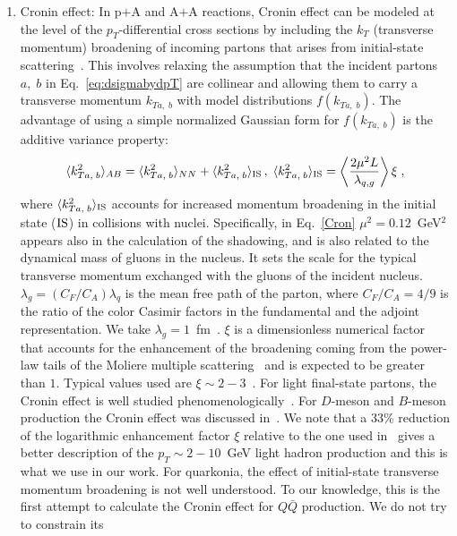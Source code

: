 \documentclass[article,showpacs,preprintnumbers,amsmath,amssymb]{revtex4}
\newcommand{\barQ}{{\bar{Q}}}
\newcommand{\rIS}{{\rm IS}}
\begin{document}
\begin{enumerate}
\item{Cronin effect: In p$+$A and A$+$A reactions, Cronin effect can be modeled at the
level of the $p_T$-differential cross sections by including the $k_T$
(transverse momentum) broadening of incoming partons that arises from
initial-state scattering~\cite{Accardi:2002ik,Vitev:2003xu}. This involves
relaxing the assumption that the incident partons $a,\;b$ in
Eq.~\ref{eq:dsigmabydpT} are collinear and allowing them to carry a
transverse momentum $k_{Ta,\;b}$ with model distributions $f(k_{Ta,\;b})$. The
advantage of using a simple normalized Gaussian form for $f({k}_{Ta,\;b})$ is
the additive variance property:   
\begin{equation}
\langle {k}_{Ta,\;b}^2 \rangle_{AB} = \langle { k}_{Ta,\;b}^2 \rangle_{NN}
+  \langle {k}_{Ta,\;b}^2 \rangle_{\rIS}\, , \;  
\langle {k}_{Ta,\;b}^2 \rangle_{\rIS} = \left\langle \frac{2 \mu^2 L}{\lambda_{q,g}}  
\right\rangle \xi\label{Cron}\;,
\end{equation}
where $\langle {k}_{Ta,\;b}^2 \rangle_{\rIS}$ accounts for increased momentum
broadening in the initial state ($\rIS$) in collisions with nuclei.
Specifically, in Eq.~\ref{Cron}  $\mu^2 = 0.12$~GeV$^2$ appears also in
the calculation of the shadowing, and is also related to the dynamical mass of
gluons in the nucleus. It sets the scale for the typical transverse momentum
exchanged with the gluons of the incident nucleus. $\lambda_g = (C_F/C_A)
\lambda_q$ is the mean free path of the parton, where $C_F/C_A=4/9$
is the ratio of the color Casimir factors in the fundamental and the adjoint
representation. We take $\lambda_g=1$~fm~\cite{Vitev:2003xu}.
 $\xi$ is a dimensionless numerical factor that accounts for the
enhancement of the broadening coming from the power-law tails of the Moliere
multiple scattering~\cite{Vitev:2002} and is expected to be greater than $1$.
Typical values used are $\xi\sim2-3$~\cite{hep-ph/0611109}. For light
final-state partons, the Cronin effect is well studied
phenomenologically~\cite{Vitev:2003xu}. For $D$-meson and $B$-meson production
the Cronin effect was discussed in~\cite{Sharma:2009hn}.  We note that a 33\%
reduction of the logarithmic enhancement factor $\xi$ relative to the one used
in~\cite{Sharma:2009hn} gives a better description of the  $p_T \sim2-10$~GeV
light hadron production and this is what we use in our work. For quarkonia, the
effect of initial-state transverse momentum broadening is not well understood.
To our knowledge, this is the first attempt to calculate the Cronin effect for
$Q\barQ$ production. We do not try to constrain its
}
\end{enumerate}
\end{document}
